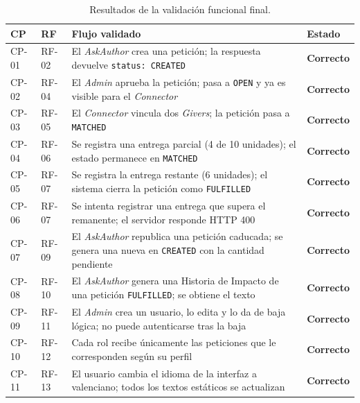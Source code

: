 \documentclass[11pt,oneside,spanish,listoffigures,listoftables]{tfgetsinf}
\begin{document}
\begin{table}[ht]
\centering
\caption[Resultados de la validación funcional final]{Resultados de la validación funcional final.}
\label{tab:pruebas-funcionales}
\footnotesize
\renewcommand{\arraystretch}{1.3}
\begin{tabularx}{\textwidth}{%
  >{\raggedright\arraybackslash}p{0.7cm}%
  >{\raggedright\arraybackslash}p{0.9cm}%
  >{\raggedright\arraybackslash}X%
  >{\raggedright\arraybackslash}p{1.4cm}}
\toprule
\textbf{CP} & \textbf{RF} & \textbf{Flujo validado} & \textbf{Estado} \\
\midrule
CP-01 & RF-02 & El \textit{AskAuthor} crea una petición; la respuesta devuelve \texttt{status: CREATED} & \textbf{Correcto} \\
CP-02 & RF-04 & El \textit{Admin} aprueba la petición; pasa a \texttt{OPEN} y ya es visible para el \textit{Connector} & \textbf{Correcto} \\
CP-03 & RF-05 & El \textit{Connector} vincula dos \textit{Givers}; la petición pasa a \texttt{MATCHED} & \textbf{Correcto} \\
CP-04 & RF-06 & Se registra una entrega parcial (4 de 10 unidades); el estado permanece en \texttt{MATCHED} & \textbf{Correcto} \\
CP-05 & RF-07 & Se registra la entrega restante (6 unidades); el sistema cierra la petición como \texttt{FULFILLED} & \textbf{Correcto} \\
CP-06 & RF-07 & Se intenta registrar una entrega que supera el remanente; el servidor responde HTTP 400 & \textbf{Correcto} \\
CP-07 & RF-09 & El \textit{AskAuthor} republica una petición caducada; se genera una nueva en \texttt{CREATED} con la cantidad pendiente & \textbf{Correcto} \\
CP-08 & RF-10 & El \textit{AskAuthor} genera una Historia de Impacto de una petición \texttt{FULFILLED}; se obtiene el texto & \textbf{Correcto} \\
CP-09 & RF-11 & El \textit{Admin} crea un usuario, lo edita y lo da de baja lógica; no puede autenticarse tras la baja & \textbf{Correcto} \\
CP-10 & RF-12 & Cada rol recibe únicamente las peticiones que le corresponden según su perfil & \textbf{Correcto} \\
CP-11 & RF-13 & El usuario cambia el idioma de la interfaz a valenciano; todos los textos estáticos se actualizan & \textbf{Correcto} \\
\bottomrule
\end{tabularx}
\end{table}
\end{document}

